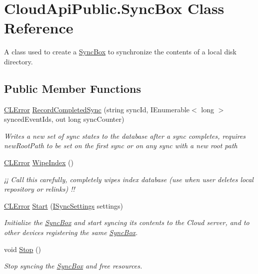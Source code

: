 \hypertarget{class_cloud_api_public_1_1_sync_box}{\section{Cloud\-Api\-Public.\-Sync\-Box Class Reference}
\label{class_cloud_api_public_1_1_sync_box}
}


A class used to create a \hyperlink{class_cloud_api_public_1_1_sync_box}{Sync\-Box} to synchronize the contents of a local disk directory.  


\subsection*{Public Member Functions}
\begin{DoxyCompactItemize}
\item 
\hyperlink{class_cloud_api_public_1_1_model_1_1_c_l_error}{C\-L\-Error} \hyperlink{class_cloud_api_public_1_1_sync_box_a5c4b8088f3cb0bf9930a547d23859386}{Record\-Completed\-Sync} (string sync\-Id, I\-Enumerable$<$ long $>$ synced\-Event\-Ids, out long sync\-Counter)
\begin{DoxyCompactList}\small\item\em Writes a new set of sync states to the database after a sync completes, requires new\-Root\-Path to be set on the first sync or on any sync with a new root path \end{DoxyCompactList}\item 
\hyperlink{class_cloud_api_public_1_1_model_1_1_c_l_error}{C\-L\-Error} \hyperlink{class_cloud_api_public_1_1_sync_box_a706f9683ae7b97190e9e4c27bcf6aa04}{Wipe\-Index} ()
\begin{DoxyCompactList}\small\item\em ¡¡ Call this carefully, completely wipes index database (use when user deletes local repository or relinks) !! \end{DoxyCompactList}\item 
\hyperlink{class_cloud_api_public_1_1_model_1_1_c_l_error}{C\-L\-Error} \hyperlink{class_cloud_api_public_1_1_sync_box_ae0ad47eda9e97480349950618ec266fa}{Start} (\hyperlink{interface_cloud_api_public_1_1_interfaces_1_1_i_sync_settings}{I\-Sync\-Settings} settings)
\begin{DoxyCompactList}\small\item\em Initialize the \hyperlink{class_cloud_api_public_1_1_sync_box}{Sync\-Box} and start syncing its contents to the Cloud server, and to other devices registering the same \hyperlink{class_cloud_api_public_1_1_sync_box}{Sync\-Box}. \end{DoxyCompactList}\item 
void \hyperlink{class_cloud_api_public_1_1_sync_box_a109192793123771a82a8c8dbbe918bb8}{Stop} ()
\begin{DoxyCompactList}\small\item\em Stop syncing the \hyperlink{class_cloud_api_public_1_1_sync_box}{Sync\-Box} and free resources. \end{DoxyCompactList}\end{DoxyCompactItemize}
